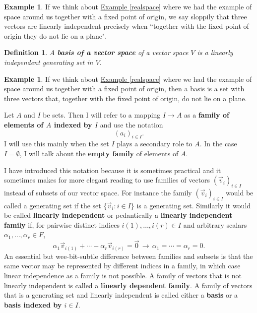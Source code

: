 \documentclass[11pt]{amsbook}
\newtheorem{definition}[theorem]{Definition}
\theoremstyle{definition}
\newtheorem{ex}[theorem]{Example}
\begin{document}
\begin{ex} If we think about \hyperref[realspace]{Example \ref{realspace}} where we had the example of {\textcolor{black}{space around us}} together with a fixed point of origin, we say sloppily that three vectors are linearly independent precisely when ``together with the fixed point of origin they do not lie on a plane".
\end{ex}


\begin{definition} \label{basis}A {\bf basis of a vector space} of a vector space $V$ is a linearly independent generating set in $V$.
\end{definition}

\begin{ex}
If we think about \hyperref[realspace]{Example \ref{realspace}} where we had the example of {\textcolor{black}{space around us}} together with a fixed point of origin, then a basis is a set with three vectors that, together with the fixed point of origin, do not lie on a plane.
\end{ex}

Let $A$ and $I$ be sets. Then I will refer to a mapping $I\to A$ as a {\bf family of elements of $A$ indexed by $I$} and use the notation $$(a_i)_{i\in I}.$$ I will use this mainly when the set $I$ plays a secondary role to $A$. In the case $I = \emptyset$, I will talk about the {\bf empty family} of elements of $A$.

I have introduced this notation because it is sometimes practical and it sometimes makes for more elegant reading to use families of vectors $(\vec{v}_i)_{i\in I}$ instead of subsets of our vector space. For instance the family $(\vec{v}_i)_{i\in I}$ would be called a generating set if the set $\{ \vec{v}_i : i \in I\}$ is a generating set. Similarly it would be called {\bf linearly independent} or pedantically a {\bf linearly independent family} if, for pairwise distinct indices $i(1), \ldots , i(r) \in I$ and arbitrary scalars $\alpha_1, \ldots , \alpha_r \in F$, $$\alpha_{1}\vec{v}_{i(1)} + \cdots + \alpha_{r}\vec{v}_{i(r)} = \vec{0} \, \to \, \alpha_1 = \cdots = \alpha_r = 0.$$ An essential but wee-bit-subtle difference between families and subsets is that the same vector may be represented by different indices in a family, in which case linear independence as a family is not possible. A family of vectors that is not linearly independent is called a {\bf linearly dependent family}. A family of vectors that is a generating set and linearly independent is called either a {\bf basis} or a {\bf basis indexed by $i\in I$}.
\end{document}
